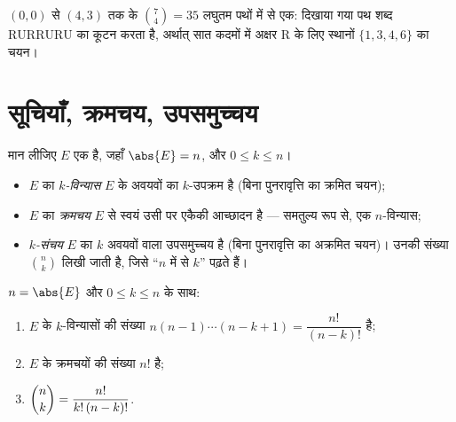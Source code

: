 \begin{omfigure}

{\small $(0,0)$ से $(4,3)$ तक के $\binom74 = 35$ लघुतम पथों में से एक:
दिखाया गया पथ शब्द $\mathrm{RURRURU}$ का कूटन करता है, अर्थात् सात कदमों में
अक्षर R के लिए स्थानों $\{1,3,4,6\}$ का चयन।}
\end{omfigure}

\section{सूचियाँ, क्रमचय, उपसमुच्चय}

\begin{definition}[विन्यास, क्रमचय, संचय]\label{def:b1:counting:objects}
मान लीजिए $E$ एक  है, जहाँ $\abs{E} = n$, और $0 \leq k \leq n$।
\begin{itemize}
  \item $E$ का \emph{$k$-विन्यास} $E$ के अवयवों का  $k$-उपक्रम है (बिना
  पुनरावृत्ति का क्रमित चयन);
  \item $E$ का \emph{क्रमचय} $E$ से स्वयं उसी पर एकैकी आच्छादन
  है --- समतुल्य रूप से, एक $n$-विन्यास;
  \item \emph{$k$-संचय} $E$ का $k$ अवयवों वाला उपसमुच्चय है (बिना
  पुनरावृत्ति का अक्रमित चयन)। उनकी संख्या $\binom{n}{k}$ लिखी जाती है, जिसे
  ``$n$ में से $k$'' पढ़ते हैं।
\end{itemize}
\end{definition}

\begin{theorem}[तीनों गणनाएँ]\label{thm:b1:counting:counts}
$n = \abs{E}$ और $0 \leq k \leq n$ के साथ:
\begin{enumerate}
  \item $E$ के $k$-विन्यासों की संख्या $n (n-1) \cdots (n-k+1) =
  \dfrac{n!}{(n-k)!}$ है;
  \item $E$ के क्रमचयों की संख्या $n!$ है;
  \item $\dbinom{n}{k} = \dfrac{n!}{k!\,(n-k)!}$.
\end{enumerate}
\end{theorem}

